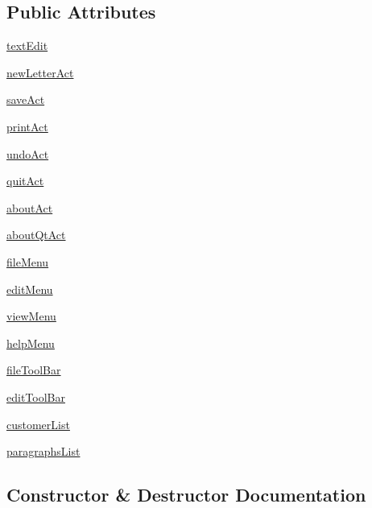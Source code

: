\subsection*{Public Attributes}
\begin{DoxyCompactItemize}
\item 
\hyperlink{classdockwidgets_1_1MainWindow_a5da9f07ece704f53a540ab38b866037b}{text\+Edit}
\item 
\hyperlink{classdockwidgets_1_1MainWindow_a75331303a80f4e2244ba5c433b63aa85}{new\+Letter\+Act}
\item 
\hyperlink{classdockwidgets_1_1MainWindow_ab20079448e2e38afe9032db4aa6538b5}{save\+Act}
\item 
\hyperlink{classdockwidgets_1_1MainWindow_a02586e6c7c366a8082778ee214e0bc26}{print\+Act}
\item 
\hyperlink{classdockwidgets_1_1MainWindow_a759eb2cdda313af53c1658207b368a80}{undo\+Act}
\item 
\hyperlink{classdockwidgets_1_1MainWindow_ac69442719baac1144cf31f79cee6bf6a}{quit\+Act}
\item 
\hyperlink{classdockwidgets_1_1MainWindow_a6bcb002ca07024418bc3be42f6dc2b18}{about\+Act}
\item 
\hyperlink{classdockwidgets_1_1MainWindow_a4fe0fc6ab241f75eac87b937b72a9385}{about\+Qt\+Act}
\item 
\hyperlink{classdockwidgets_1_1MainWindow_a21ee1bbcdb3fd63d03d304ca5c6a5dee}{file\+Menu}
\item 
\hyperlink{classdockwidgets_1_1MainWindow_a557c2cd0e63cbb94a6dba5ac2def87f6}{edit\+Menu}
\item 
\hyperlink{classdockwidgets_1_1MainWindow_a68f69e95c0f284c73c6d70111be5d04b}{view\+Menu}
\item 
\hyperlink{classdockwidgets_1_1MainWindow_a66ccfbd0b9e5b2b191c2bd10a0dcb623}{help\+Menu}
\item 
\hyperlink{classdockwidgets_1_1MainWindow_abf5750ee333a378f94a51b7da7c60c2d}{file\+Tool\+Bar}
\item 
\hyperlink{classdockwidgets_1_1MainWindow_aef3fd85cb969adb543d57db26242abd4}{edit\+Tool\+Bar}
\item 
\hyperlink{classdockwidgets_1_1MainWindow_ad89adef89ff8c3d356178f535e7300a1}{customer\+List}
\item 
\hyperlink{classdockwidgets_1_1MainWindow_afb260f656fdad64c704e5fb43174b566}{paragraphs\+List}
\end{DoxyCompactItemize}


\subsection{Constructor \& Destructor Documentation}
\hypertarget{classdockwidgets_1_1MainWindow_a2d7e692844b5cf4420121e413740c4a2}{}

